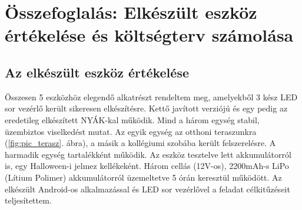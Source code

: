 \documentclass[../main.tex]{subfiles}
\begin{document}
\section{Összefoglalás: Elkészült eszköz értékelése és költségterv számolása}
    \subsection{Az elkészült eszköz értékelése}
        Összesen 5 eszközhöz elegendő alkatrészt rendeltem meg, amelyekből 3 kész LED sor vezérlő került sikeresen elkészítésre. Kettő javított verziójú és egy pedig az eredetileg elkészített NYÁK-kal működik. Mind a három egység stabil, üzembiztos viselkedést mutat. Az egyik egység az otthoni teraszunkra (\ref{fig:pic_terasz}. ábra), a másik a kollégiumi szobába került felszerelésre. A harmadik egység tartalékként működik. Az eszköz tesztelve lett akkumulátorról is, egy Halloween-i jelmez kellékeként. Három cellás (12V-os), 2200mAh-s LiPo (Lítium Polimer) akkumulátorról üzemeltetve 5 órán keresztül működött. Az elkészült Android-os alkalmazással és LED sor vezérlővel a feladat célkitűzéseit teljesítettem.
    
\end{document}

